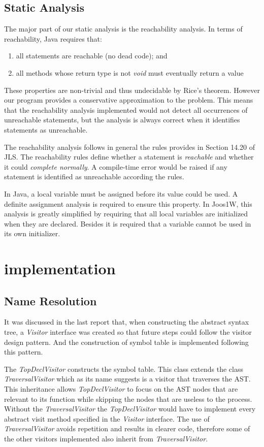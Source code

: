 \documentclass[a4paper, notitlepage]{report}
\begin{document}
\section{Static Analysis}

The major part of our static analysis is the reachability analysis. In terms of reachability, Java requires that:
\begin{enumerate}
\item all statements are reachable (no dead code); and 
\item all methods whose return type is not \emph{void} must eventually return a value
\end{enumerate}
These properties are non-trivial and thus undecidable by Rice's theorem. However our program provides a conservative approximation to the problem. This means that the reachability analysis implemented would not detect all occurrences of unreachable statements, but the analysis is always correct when it identifies statements as unreachable.

The reachability analysis follows in general the rules provides in Section 14.20 of JLS. The reachability rules define whether a statement is \emph{reachable} and whether it could \emph{complete normally}. A compile-time error would be raised if any statement is identified as unreachable according the rules.

In Java, a local variable must be assigned before its value could be used. A definite assignment analysis is required to ensure this property. In Joos1W, this analysis is greatly simplified by requiring that all local variables are initialized when they are declared. Besides it is required that a variable cannot be used in its own initializer.

\chapter{implementation}
\section{Name Resolution}

It was discussed in the last report that, when constructing the abstract syntax tree, a \emph{Visitor} interface was created so that future steps could follow the visitor design pattern. And the construction of symbol table is implemented following this pattern.

The \emph{TopDeclVisitor} constructs the symbol table. This class extends the class \emph{TraversalVisitor} which as its name suggests is a visitor that traverses the AST. This inheritance allows \emph{TopDeclVisitor} to focus on the AST nodes that are relevant to its function while skipping the nodes that are useless to the process. Without the \emph{TraversalVisitor} the \emph{TopDeclVisitor} would have to implement every abstract visit method specified in the \emph{Visitor} interface. The use of \emph{TraversalVisitor} avoids repetition and results in clearer code, therefore some of the other visitors implemented also inherit from \emph{TraversalVisitor}.
\end{document}
